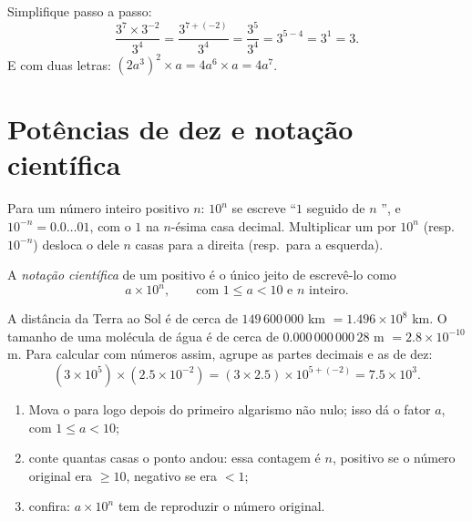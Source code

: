 \begin{example}\label{ex:g9:fractions:rules}
Simplifique passo a passo:
\[
\frac{3^7 \times 3^{-2}}{3^4}
= \frac{3^{7 + (-2)}}{3^4}
= \frac{3^5}{3^4}
= 3^{5-4} = 3^1 = 3 .
\]
E com duas letras: $(2a^3)^2 \times a = 4 a^6 \times a = 4a^7$.
\end{example}

\section{Potências de dez e notação científica}

\begin{proposition}\label{prop:g9:fractions:ten}
Para um número inteiro positivo $n$: $10^n$ se escreve ``$1$ seguido
de $n$ '', e $10^{-n} = 0.0\dots01$, com o $1$ na $n$-ésima casa
decimal. Multiplicar um  por $10^n$ (resp.\ $10^{-n}$)
desloca o  dele $n$ casas para a direita (resp.\ para a
esquerda).
\end{proposition}

\begin{definition}\label{def:g9:fractions:scientific}
A \emph{notação científica} de um  positivo é o único jeito de escrevê-lo como
\[
a \times 10^n,
\qquad\text{com } 1 \leq a < 10 \text{ e } n \text{ inteiro.}
\]
\end{definition}

\begin{example}\label{ex:g9:fractions:scientific}
A distância da Terra ao Sol é de cerca de $149\,600\,000$ km
$= 1.496 \times 10^8$ km. O tamanho de uma molécula de água é de cerca
de $0.000\,000\,000\,28$ m $= 2.8 \times 10^{-10}$ m. Para calcular com
números assim, agrupe as partes decimais e as  de dez:
\[
(3 \times 10^5) \times (2.5 \times 10^{-2})
= (3 \times 2.5) \times 10^{5 + (-2)}
= 7.5 \times 10^{3}.
\]
\end{example}

\begin{method}\label{met:g9:fractions:scientific}
\begin{enumerate}
  \item Mova o  para logo depois do primeiro algarismo não
        nulo; isso dá o fator $a$, com $1 \leq a < 10$;
  \item conte quantas casas o ponto andou: essa contagem é $n$,
        positivo se o número original era $\geq 10$, negativo se era
        $< 1$;
  \item confira: $a \times 10^n$ tem de reproduzir o número original.
\end{enumerate}
\end{method}

